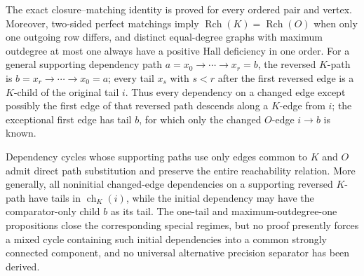 The exact closure--matching identity is proved for every ordered pair and vertex.  Moreover, two-sided perfect matchings imply \(\operatorname{Rch}(K)=\operatorname{Rch}(O)\) when only one outgoing row differs, and distinct equal-degree graphs with maximum outdegree at most one always have a positive Hall deficiency in one order.  For a general supporting dependency path \(a=x_0\to\cdots\to x_r=b\), the reversed \(K\)-path is \(b=x_r\to\cdots\to x_0=a\); every tail \(x_s\) with \(s<r\) after the first reversed edge is a \(K\)-child of the original tail \(i\).  Thus every dependency on a changed edge except possibly the first edge of that reversed path descends along a \(K\)-edge from \(i\); the exceptional first edge has tail \(b\), for which only the changed \(O\)-edge \(i\to b\) is known.

Dependency cycles whose supporting paths use only edges common to \(K\) and \(O\) admit direct path substitution and preserve the entire reachability relation.  More generally, all noninitial changed-edge dependencies on a supporting reversed \(K\)-path have tails in \(\operatorname{ch}_K(i)\), while the initial dependency may have the comparator-only child \(b\) as its tail.  The one-tail and maximum-outdegree-one propositions close the corresponding special regimes, but no proof presently forces a mixed cycle containing such initial dependencies into a common strongly connected component, and no universal alternative precision separator has been derived.
